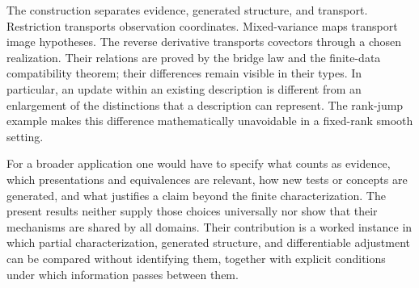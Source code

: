 \documentclass[11pt]{article}
\theoremstyle{definition}
\begin{document}
The construction separates evidence, generated structure, and transport.
Restriction transports observation coordinates. Mixed-variance maps transport
image hypotheses. The reverse derivative transports covectors through a
chosen realization. Their relations are proved by the bridge law and the
finite-data compatibility theorem; their differences remain visible in their
types. In particular, an update within an existing description is different
from an enlargement of the distinctions that a description can represent.
The rank-jump example makes this difference mathematically unavoidable in a
fixed-rank smooth setting.

For a broader application one would have to specify what counts as evidence,
which presentations and equivalences are relevant, how new tests or concepts
are generated, and what justifies a claim beyond the finite characterization.
The present results neither supply those choices universally nor show that
their mechanisms are shared by all domains. Their contribution is a worked
instance in which partial characterization, generated structure, and
differentiable adjustment can be compared without identifying them, together
with explicit conditions under which information passes between them.
\end{document}
